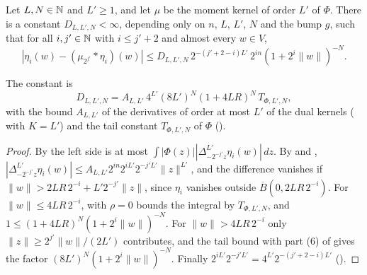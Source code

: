 \begin{lemma}
\label{lem:dual-averaged-differences}
\leanok
{}
Let $L, N \in \mathbb{N}$ and $L' \geq 1$, and let $\mu$ be the moment kernel of order $L'$ of $\Phi$.
There is a constant $D_{L,L',N} < \infty$, depending only on $n$, $L$, $L'$, $N$ and the bump
$g$, such that for all $i, j' \in \mathbb{N}$ with $i \leq j' + 2$ and almost every $w \in V$,
\[
  |\eta_i(w) - (\mu_{2^{j'}} * \eta_i)(w)| \leq D_{L,L',N} \, 2^{-(j'+2-i)L'} \, 2^{in}
  (1 + 2^i \|w\|)^{-N} .
\]
\end{lemma}

The constant is
\[
  D_{L,L',N} = A_{L,L'} \, 4^{L'} (8 L')^N (1 + 4LR)^N \, T_{\Phi,L',N} ,
\]
with the bound $A_{L,L'}$ of the derivatives of order at most $L'$ of the dual kernels
( with $K = L'$) and the tail constant $T_{\Phi,L',N}$ of
$\Phi$ ().

\begin{proof}
\leanok
By  the left side is at most
$\int |\Phi(z)| |\Delta^{L'}_{-2^{-j'} z} \eta_i(w)| \, dz$. By  and
,
$|\Delta^{L'}_{-2^{-j'} z} \eta_i(w)| \leq A_{L,L'} 2^{in} 2^{iL'} 2^{-j'L'} \|z\|^{L'}$, and
the difference vanishes if $\|w\| > 2LR \, 2^{-i} + L' 2^{-j'} \|z\|$, since $\eta_i$ vanishes
outside $\overline B(0, 2LR \, 2^{-i})$. For $\|w\| \leq 4LR \, 2^{-i}$, 
with $\rho = 0$ bounds the integral by $T_{\Phi,L',N}$, and
$1 \leq (1 + 4LR)^N (1 + 2^i \|w\|)^{-N}$. For $\|w\| > 4LR \, 2^{-i}$ only
$\|z\| \geq 2^{j'} \|w\| / (2L')$ contributes, and the tail bound with part (6) of
 gives the factor $(8L')^N (1 + 2^i \|w\|)^{-N}$. Finally
$2^{iL'} 2^{-j'L'} = 4^{L'} 2^{-(j'+2-i)L'}$ ().
\end{proof}


